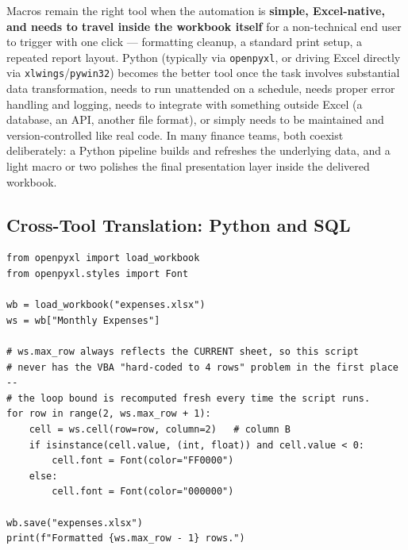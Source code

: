 \documentclass[11pt,a4paper]{article}
\begin{document}
\begin{keyconcept}
Macros remain the right tool when the automation is \textbf{simple, Excel-native, and needs to travel inside the workbook itself} for a non-technical end user to trigger with one click --- formatting cleanup, a standard print setup, a repeated report layout. Python (typically via \texttt{openpyxl}, or driving Excel directly via \texttt{xlwings}/\texttt{pywin32}) becomes the better tool once the task involves substantial data transformation, needs to run unattended on a schedule, needs proper error handling and logging, needs to integrate with something outside Excel (a database, an API, another file format), or simply needs to be maintained and version-controlled like real code. In many finance teams, both coexist deliberately: a Python pipeline builds and refreshes the underlying data, and a light macro or two polishes the final presentation layer inside the delivered workbook.
\end{keyconcept}

\subsection{Cross-Tool Translation: Python and SQL}

\begin{lstlisting}[style=pythonstyle, caption={The same "highlight negatives" macro from S3.8, in Python -- notice it needs no dynamic-range fix, because it naturally operates on however many rows exist}]
from openpyxl import load_workbook
from openpyxl.styles import Font

wb = load_workbook("expenses.xlsx")
ws = wb["Monthly Expenses"]

# ws.max_row always reflects the CURRENT sheet, so this script
# never has the VBA "hard-coded to 4 rows" problem in the first place --
# the loop bound is recomputed fresh every time the script runs.
for row in range(2, ws.max_row + 1):
    cell = ws.cell(row=row, column=2)   # column B
    if isinstance(cell.value, (int, float)) and cell.value < 0:
        cell.font = Font(color="FF0000")
    else:
        cell.font = Font(color="000000")

wb.save("expenses.xlsx")
print(f"Formatted {ws.max_row - 1} rows.")
\end{lstlisting}
\end{document}
